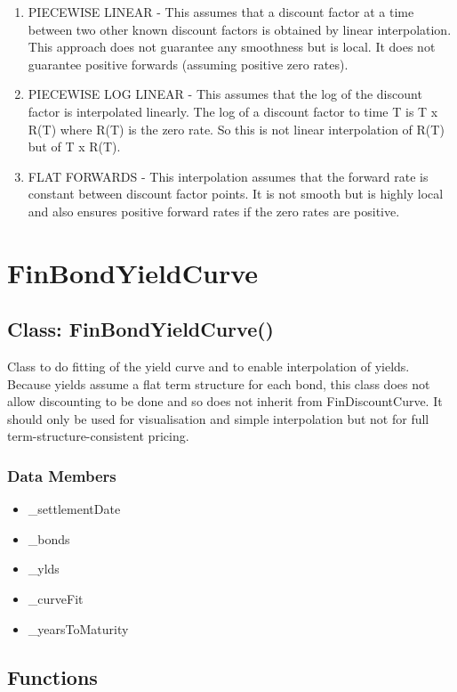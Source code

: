 \documentclass[twoside,11pt]{book}
\begin{document}
\begin{enumerate}
\item{ PIECEWISE LINEAR - This assumes that a discount factor at a time between two other known discount factors is obtained by linear interpolation. This approach does not guarantee any smoothness but is local. It does not guarantee positive forwards (assuming positive zero rates).
}
\item{ PIECEWISE LOG LINEAR - This assumes that the log of the discount factor is interpolated linearly. The log of a discount factor to time T is T x R(T) where R(T) is the zero rate. So this is not linear interpolation of R(T) but of T x R(T).
}
\item{ FLAT FORWARDS - This interpolation assumes that the forward rate is constant between discount factor points. It is not smooth but is highly local and also ensures positive forward rates if the zero rates are positive.
}
\end{enumerate}
\newpage
\section{FinBondYieldCurve}

\subsection*{Class: FinBondYieldCurve()}
Class to do fitting of the yield curve and to enable interpolation of  yields. Because yields assume a flat term structure for each bond, this  class does not allow discounting to be done and so does not inherit from  FinDiscountCurve. It should only be used for visualisation and simple  interpolation but not for full term-structure-consistent pricing.  

\subsubsection*{Data Members}
\begin{itemize}
\item{\_settlementDate}
\item{\_bonds}
\item{\_ylds}
\item{\_curveFit}
\item{\_yearsToMaturity}
\end{itemize}

\subsection*{Functions}
\end{document}
